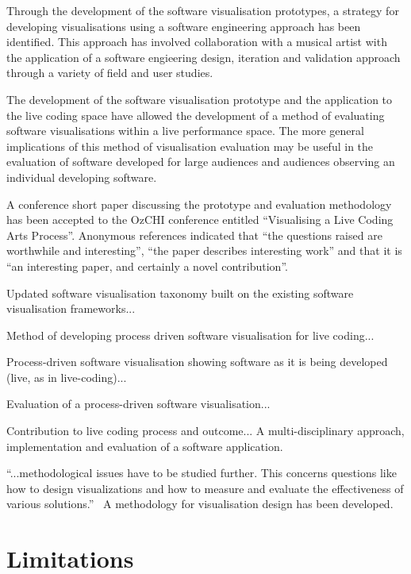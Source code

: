 Through the development of the software visualisation prototypes, a strategy for developing visualisations using a software engineering approach has been identified. This approach has involved collaboration with a musical artist with the application of a software engieering design, iteration and validation approach through a variety of field and user studies.

The development of the software visualisation prototype and the application to the live coding space have allowed the development of a method of evaluating software visualisations within a live performance space. The more general implications of this method of visualisation evaluation may be useful in the evaluation of software developed for large audiences and audiences observing an individual developing software.

A conference short paper discussing the prototype and evaluation methodology has been accepted to the OzCHI conference entitled ``Visualising a Live Coding Arts Process''. Anonymous references indicated that ``the questions raised are worthwhile and interesting'', ``the paper describes interesting work'' and that it is ``an interesting paper, and certainly a novel contribution''.


Updated software visualisation taxonomy built on the existing software visualisation frameworks...

Method of developing process driven software visualisation for live coding...

Process-driven software visualisation showing software as it is being developed (live, as in live-coding)...

Evaluation of a process-driven software visualisation...

Contribution to live coding process and outcome... A multi-disciplinary approach, implementation and evaluation of a software application.

``...methodological issues have to be studied further. This concerns questions like how to design visualizations and how to measure and evaluate the effectiveness of various solutions.''~\cite{VanWijk2005} A methodology for visualisation design has been developed.


\section{Limitations}

